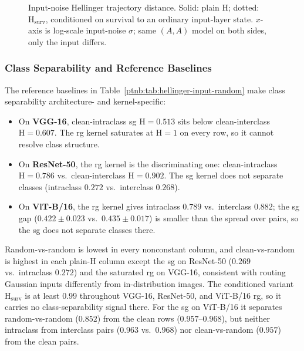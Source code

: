 \begin{figure}[H]
    \centering
    
    \caption[Input-noise Hellinger trajectory distance]{Input-noise Hellinger trajectory distance. Solid: plain $\mathrm{H}$; dotted:
    $\mathrm{H}_{\mathrm{surv}}$, conditioned on survival to an ordinary input-layer state. $x$-axis is
    log-scale input-noise $\sigma$; same $(A,A)$ model on both sides, only the input differs.}
    \label{ptnb:fig:hellinger-input-noise}
\end{figure}

\subsubsection{Class Separability and Reference Baselines}\label{ptnb:sec:input-noise-baselines}

The reference baselines in Table~\ref{ptnb:tab:hellinger-input-random} make class separability architecture- and kernel-specific:
\begin{itemize}
    \item On \textbf{VGG-16}, clean-intraclass \ac{sg} $\mathrm{H}=0.513$ sits below clean-interclass $\mathrm{H}=0.607$. The \ac{rg} kernel saturates at $\mathrm{H}=1$ on every row, so it cannot resolve class structure.
    \item On \textbf{ResNet-50}, the \ac{rg} kernel is the discriminating one: clean-intraclass $\mathrm{H}=0.786$ vs.\ clean-interclass $\mathrm{H}=0.902$. The \ac{sg} kernel does not separate classes (intraclass $0.272$ vs.\ interclass $0.268$).
    \item On \textbf{ViT-B/16}, the \ac{rg} kernel gives intraclass $0.789$ vs.\ interclass $0.882$; the \ac{sg} gap ($0.422 \pm 0.023$ vs.\ $0.435 \pm 0.017$) is smaller than the spread over pairs, so the \ac{sg} does not separate classes there.
\end{itemize}
Random-vs-random is lowest in every nonconstant column, and clean-vs-random is highest in each plain-$\mathrm{H}$ column except the \ac{sg} on ResNet-50 ($0.269$ vs.\ intraclass $0.272$) and the saturated \ac{rg} on VGG-16, consistent with routing Gaussian inputs differently from in-distribution images. The conditioned variant $\mathrm{H}_{\mathrm{surv}}$ is at least $0.99$ throughout VGG-16, ResNet-50, and ViT-B/16 \ac{rg}, so it carries no class-separability signal there. For the \ac{sg} on ViT-B/16 it separates random-vs-random ($0.852$) from the clean rows ($0.957$--$0.968$), but neither intraclass from interclass pairs ($0.963$ vs.\ $0.968$) nor clean-vs-random ($0.957$) from the clean pairs.

